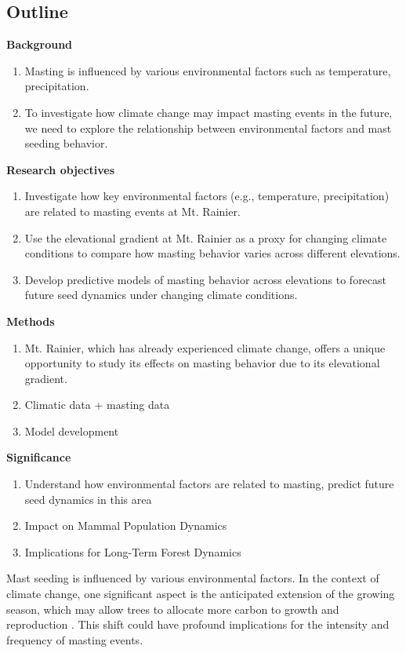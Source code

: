 \documentclass[11pt,letter]{article}
\begin{document}
\subsection{Outline}
\textbf{Background}
\begin{enumerate}
\item Masting is influenced by various environmental factors such as temperature, precipitation.
\item To investigate how climate change may impact masting events in the future, we need to explore the relationship between environmental factors and mast seeding behavior.
\end{enumerate}	
\textbf{Research objectives}
\begin{enumerate}
\item Investigate how key environmental factors (e.g., temperature, precipitation) are related to masting events at Mt. Rainier.
\item Use the elevational gradient at Mt. Rainier as a proxy for changing climate conditions to compare how masting behavior varies across different elevations.
\item Develop predictive models of masting behavior across elevations to forecast future seed dynamics under changing climate conditions.
\end{enumerate}
\textbf{Methods}
\begin{enumerate}
\item Mt. Rainier, which has already experienced climate change, offers a unique opportunity to study its effects on masting behavior due to its  elevational gradient.
\item Climatic data + masting data
\item Model development
\end{enumerate}
\textbf{Significance}
\begin{enumerate}
\item Understand how environmental factors are related to masting, predict future seed dynamics in this area
\item Impact on Mammal Population Dynamics
\item Implications for Long-Term Forest Dynamics
\end{enumerate}
Mast seeding is influenced by various environmental factors. In the context of climate change, one significant aspect is the anticipated extension of the growing season, which may allow trees to allocate more carbon to growth and reproduction \citep{keenan2014net}. This shift could have profound implications for the intensity and frequency of masting events.
\end{document}
